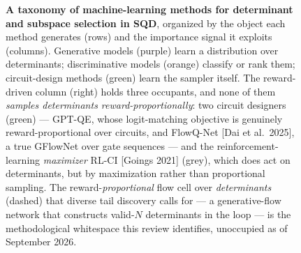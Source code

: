 \documentclass[onecolumn,a4paper]{quantumarticle}
\begin{document}
\begin{figure}[tbp]
\caption{\textbf{A taxonomy of machine-learning methods for determinant and subspace selection in SQD}, organized by the object each method generates (rows) and the importance signal it exploits (columns). Generative models (purple) learn a distribution over determinants; discriminative models (orange) classify or rank them; circuit-design methods (green) learn the sampler itself. The reward-driven column (right) holds three occupants, and none of them \emph{samples determinants reward-proportionally}: two circuit designers (green) --- GPT-QE, whose logit-matching objective is genuinely reward-proportional over circuits, and FlowQ-Net [Dai et al.\ 2025], a true GFlowNet over gate sequences --- and the reinforcement-learning \emph{maximizer} RL-CI [Goings 2021] (grey), which does act on determinants, but by maximization rather than proportional sampling. The reward-\emph{proportional} flow cell over \emph{determinants} (dashed) that diverse tail discovery calls for --- a generative-flow network that constructs valid-$N$ determinants in the loop --- is the methodological whitespace this review identifies, unoccupied as of September 2026.}
\label{fig:taxonomy}
\end{figure}
\end{document}
